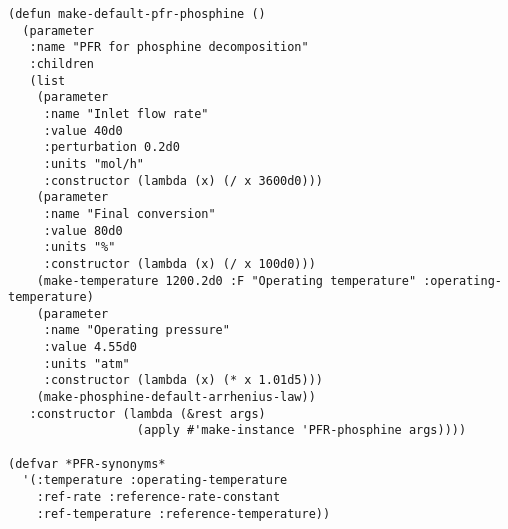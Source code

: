 \documentclass[listings, a4paper, fleqn, pdftex, 12pt, openany, oneside, final]{memoir}
\theoremstyle{definition}
\begin{document}
\begin{verbatim}
(defun make-default-pfr-phosphine ()
  (parameter
   :name "PFR for phosphine decomposition"
   :children
   (list
    (parameter
     :name "Inlet flow rate"
     :value 40d0
     :perturbation 0.2d0
     :units "mol/h"
     :constructor (lambda (x) (/ x 3600d0)))
    (parameter
     :name "Final conversion"
     :value 80d0
     :units "%"
     :constructor (lambda (x) (/ x 100d0)))
    (make-temperature 1200.2d0 :F "Operating temperature" :operating-temperature)
    (parameter
     :name "Operating pressure"
     :value 4.55d0
     :units "atm"
     :constructor (lambda (x) (* x 1.01d5)))
    (make-phosphine-default-arrhenius-law))
   :constructor (lambda (&rest args)
                  (apply #'make-instance 'PFR-phosphine args))))

(defvar *PFR-synonyms*
  '(:temperature :operating-temperature
    :ref-rate :reference-rate-constant
    :ref-temperature :reference-temperature))
\end{verbatim}
\end{document}
